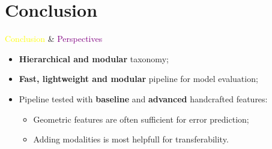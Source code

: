 \documentclass[12pt]{beamer}
\begin{document}
    \section{Conclusion}
        \begin{frame}{\textcolor{yellow}{Conclusion} \& \textcolor{purple}{Perspectives}}
            \begin{itemize}[label=\(\blacktriangleright\), font=\color{yellow}, itemsep=2em]
                \item<1-> \textbf{Hierarchical and modular} taxonomy;
                \item<2-> \textbf{Fast, lightweight and modular} pipeline for model evaluation;
                \item<3-> Pipeline tested with \textbf{baseline} and \textbf{advanced} handcrafted features:
                    \begin{itemize}[label=\(\blacktriangleright\), font=\color{IGNGreen}]
                        \item<4-> Geometric features are often sufficient for error prediction;
                        \item<5-> Adding modalities is most helpfull for transferability.
                    \end{itemize}
            \end{itemize}
        \end{frame}
\end{document}
